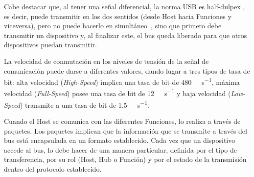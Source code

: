 Cabe destacar que, al tener una señal diferencial, la norma USB es {half-dulpex \it}, es decir, puede transmitir en los dos sentidos (desde Host hacia Funciones y viceversa), pero no puede hacerlo en simultáneo~\cite{Riihonen2015}, sino que primero debe transmitir un dispositivo y, al finalizar este, el bus queda liberado para que otros dispositivos puedan transmitir.%

La velocidad de conmutación en los niveles de tensión de la señal de comunicación puede darse a diferentes valores, dando lugar a tres tipos de tasa de bit: alta velocidad ({\it High-Speed}) implica una tasa de bit de \SI{480}{\mega\bit\per\second}, máxima velocidad ({\it Full-Speed}) posee una tasa de bit de \SI{12}{\mega\bit\per\second} y baja velocidad ({\it Low-Speed}) transmite a una tasa de bit de \SI{1.5}{\mega\bit\per\second}.%

Cuando el Host se comunica con las diferentes Funciones, lo realiza a través de paquetes. Los paquetes implican que la información que se transmite a través del bus está encapsulada en un formato establecido. Cada vez que un dispositivo accede al bus, lo debe hacer de una manera particular, definida por el tipo de transferencia, por su rol (Host, Hub o Función) y por el estado de la transmisión dentro del protocolo establecido.